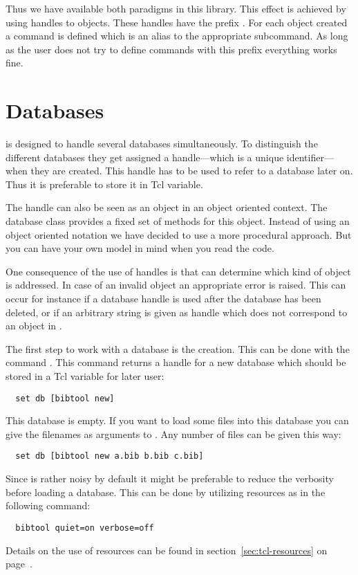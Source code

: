 Thus we have available both paradigms in this library. This effect is
achieved by using handles to objects. These handles have the prefix
. For each object created a command is defined which is
an alias to the appropriate  subcommand. As long as the
user does not try to define commands with this prefix everything works
fine.


\section{Databases}

 is designed to handle several databases simultaneously.
To distinguish the different databases they get assigned a
handle---which is a unique identifier---when they are created.  This
handle has to be used to refer to a database later on.  Thus it is
preferable to store it in Tcl variable.

The handle can also be seen as an object in an object oriented
context.  The database class provides a fixed set of methods for this
object.  Instead of using an object oriented notation we have decided
to use a more procedural approach.  But you can have your own model in
mind when you read the code.

One consequence of the use of handles is that \BibTool{} can determine
which kind of object is addressed.  In case of an invalid object an
appropriate error is raised.  This can occur for instance if a
database handle is used after the database has been deleted, or if an
arbitrary string is given as handle which does not correspond to an
object in \BibTool.

The first step to work with a database is the creation.  This can be
done with the command .  This command returns a
handle for a new database which should be stored in a Tcl variable for
later user:
\begin{verbatim}
  set db [bibtool new]
\end{verbatim}%
This database is empty. If you want to load some files into this
database you can give the filenames as arguments to . Any number of \BibTeX{} files can be given this way:
\begin{verbatim}
  set db [bibtool new a.bib b.bib c.bib]
\end{verbatim}%
Since \BibTool{} is rather noisy by default it might be preferable to
reduce the verbosity before loading a database. This can be done by
utilizing \BibTool{} resources as in the following command:
\begin{verbatim}
  bibtool quiet=on verbose=off
\end{verbatim}%
Details on the use of \BibTool{} resources can be found in
section~\ref{sec:tcl-resources} on page~\pageref{sec:tcl-resources}.


